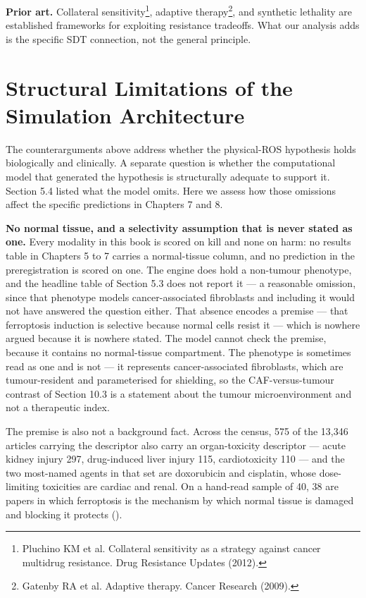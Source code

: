 \documentclass[11pt,twoside,openright]{report}
\begin{document}
\textbf{Prior art.} Collateral sensitivity\footnote{Pluchino KM et al. Collateral sensitivity as a strategy against cancer multidrug resistance. Drug Resistance Updates (2012).}, adaptive therapy\footnote{Gatenby RA et al. Adaptive therapy. Cancer Research (2009).}, and synthetic lethality are established frameworks for exploiting resistance tradeoffs. What our analysis adds is the specific SDT connection, not the general principle.

\section{Structural Limitations of the Simulation Architecture}

The counterarguments above address whether the physical-ROS hypothesis holds biologically and clinically. A separate question is whether the computational model that generated the hypothesis is structurally adequate to support it. Section 5.4 listed what the model omits. Here we assess how those omissions affect the specific predictions in Chapters 7 and 8.

\textbf{No normal tissue, and a selectivity assumption that is never stated as one.} Every modality in this book is scored on kill and none on harm: no results table in Chapters 5 to 7 carries a normal-tissue column, and no prediction in the preregistration is scored on one. The engine does hold a non-tumour phenotype, and the headline table of Section 5.3 does not report it --- a reasonable omission, since that phenotype models cancer-associated fibroblasts and including it would not have answered the question either. That absence encodes a premise --- that ferroptosis induction is selective because normal cells resist it --- which is nowhere argued because it is nowhere stated. The model cannot check the premise, because it contains no normal-tissue compartment. The  phenotype is sometimes read as one and is not --- it represents cancer-associated fibroblasts, which are tumour-resident and parameterised for shielding, so the CAF-versus-tumour contrast of Section 10.3 is a statement about the tumour microenvironment and not a therapeutic index.

The premise is also not a background fact. Across the census, 575 of the 13,346 articles carrying the  descriptor also carry an organ-toxicity descriptor --- acute kidney injury 297, drug-induced liver injury 115, cardiotoxicity 110 --- and the two most-named agents in that set are doxorubicin and cisplatin, whose dose-limiting toxicities are cardiac and renal. On a hand-read sample of 40, 38 are papers in which ferroptosis is the mechanism by which normal tissue is damaged and blocking it protects ().
\end{document}
